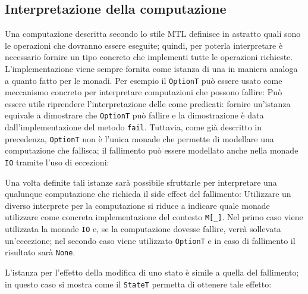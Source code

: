\subsection{Interpretazione della computazione}
Una computazione descritta secondo lo stile MTL definisce in astratto quali sono le operazioni che dovranno essere eseguite; quindi, per poterla interpretare è necessario fornire un tipo concreto che implementi tutte le operazioni richieste.
L'implementazione viene sempre fornita come istanza di una  in maniera analoga a quanto fatto per le monadi.
Per esempio il  \lstinline{OptionT} può essere usato come meccanismo concreto per interpretare computazioni che possono fallire:
Può essere utile riprendere l'interpretazione delle  come predicati: fornire un'istanza equivale a dimostrare che \lstinline{OptionT} può fallire e la dimostrazione è data dall'implementazione del metodo \lstinline{fail}. Tuttavia, come già descritto in precedenza, \lstinline{OptionT} non è l'unica monade che permette di modellare una computazione che fallisca; il fallimento può essere modellato anche nella monade \lstinline{IO} tramite l'uso di eccezioni:

Una volta definite tali istanze sarà possibile sfruttarle per interpretare una qualunque computazione che richieda il side effect del fallimento:
Utilizzare un diverso interprete per la computazione si riduce a indicare quale monade utilizzare come concreta implementazione del contesto \lstinline{M[_]}. Nel primo caso viene utilizzata la monade \lstinline{IO} e, se la computazione dovesse fallire, verrà sollevata un'eccezione; nel secondo caso viene utilizzato \lstinline{OptionT} e in caso di fallimento il risultato sarà \lstinline{None}.

L'istanza per l'effetto della modifica di uno stato è simile a quella del fallimento; in questo caso si mostra come il  \lstinline{StateT} permetta di ottenere tale effetto:

